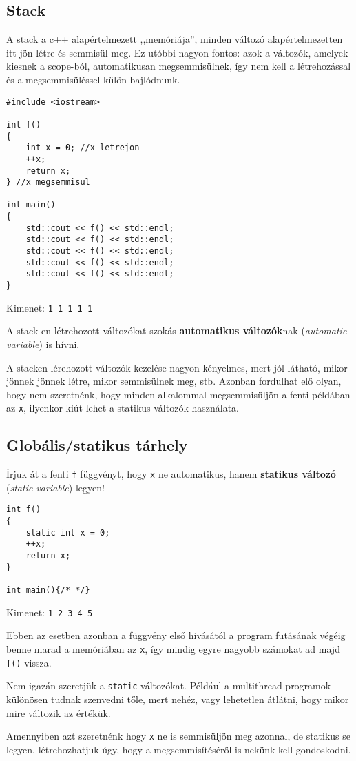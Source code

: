 \documentclass[a4paper,11.5pt]{article}
\begin{document}
	\subsection{Stack}
	A stack a c++ alapértelmezett ,,memóriája'', minden változó alapértelmezetten itt jön létre és semmisül meg. Ez utóbbi nagyon fontos: azok a változók, amelyek kiesnek a scope-ból, automatikusan megsemmisülnek, így nem kell a létrehozással és a megsemmisüléssel külön bajlódnunk.
	
	\begin{lstlisting}
#include <iostream>

int f()
{
	int x = 0; //x letrejon
	++x;
	return x;
} //x megsemmisul

int main()
{
	std::cout << f() << std::endl;
	std::cout << f() << std::endl;
	std::cout << f() << std::endl;
	std::cout << f() << std::endl;
	std::cout << f() << std::endl;
}
	\end{lstlisting}
	Kimenet: \texttt{1 1 1 1 1}
	
	A stack-en létrehozott változókat szokás \textbf{automatikus változók}nak (\textit{automatic variable}) is hívni.
	
	\smallskip
	A stacken lérehozott változók kezelése nagyon kényelmes, mert jól látható, mikor jönnek jönnek létre, mikor semmisülnek meg, stb. Azonban fordulhat elő olyan, hogy nem szeretnénk, hogy minden alkalommal megsemmisüljön a fenti példában az \texttt{x}, ilyenkor kiút lehet a statikus változók használata.
	\subsection{Globális/statikus tárhely}
	Írjuk át a fenti \texttt{f} függvényt, hogy \texttt{x} ne automatikus, hanem \textbf{statikus változó} (\textit{static variable}) legyen!
	\begin{lstlisting}
int f()
{
	static int x = 0;
	++x;
	return x;
}

int main(){/* */}
	\end{lstlisting}
	Kimenet: \texttt{1 2 3 4 5}
	
	Ebben az esetben azonban a függvény első hivásától a program futásának végéig benne marad a memóriában az \texttt{x}, így mindig egyre nagyobb számokat ad majd \texttt{f()} vissza.
	\begin{note}
		Nem igazán szeretjük a \texttt{static} változókat. Például a multithread programok különösen tudnak szenvedni tőle, mert nehéz, vagy lehetetlen átlátni, hogy mikor mire változik az értékük.
	\end{note}
	Amennyiben azt szeretnénk hogy \texttt{x} ne is semmisüljön meg azonnal, de statikus se legyen, létrehozhatjuk úgy, hogy a megsemmisítéséről is nekünk kell gondoskodni.
\end{document}

